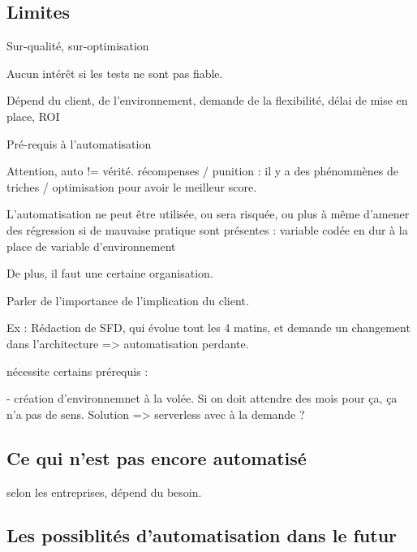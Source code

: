 \subsection*{Limites}


Sur-qualité, sur-optimisation

Aucun intérêt si les tests ne sont pas fiable.

Dépend du client, de l'environnement, demande de la flexibilité, délai de mise en place, ROI

Pré-requis à l'automatisation

Attention, auto != vérité. récompenses / punition : il y a des phénommènes de triches / optimisation pour avoir le meilleur score.

L'automatisation ne peut être utilisée, ou sera risquée, ou plus à même d'amener des régression si de mauvaise pratique sont présentes : variable codée en dur à la place de variable d'environnement

De plus, il faut une certaine organisation.

Parler de l'importance de l'implication du client. 

Ex :  Rédaction de SFD, qui évolue tout les 4 matins, et demande un changement dans l'architecture => automatisation perdante.

nécessite certains prérequis : 

- création d'environnemnet à la volée. Si on doit attendre des mois pour ça, ça n'a pas de sens. Solution => serverless avec à la demande ? 

\subsection*{Ce qui n'est pas encore automatisé}


selon les entreprises, dépend du besoin.


\subsection*{Les possiblités d'automatisation dans le futur}

